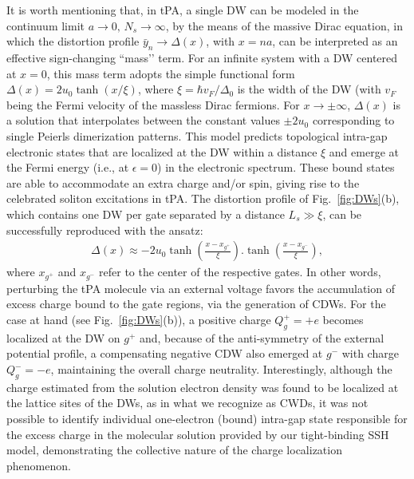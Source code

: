 \documentclass[10pt,a4paper]{article}
\begin{document}
It is worth mentioning that, in tPA, a single DW can be modeled in the continuum limit ${a \rightarrow 0, } \, { N_{s} \rightarrow \infty }$, by the means of the massive Dirac equation\cite{Jackiw76_Jackiw_Rebbi_soliton, Su79_Solitons_in_polyacetylene, Takayama80_Continuum_model_for_PA, Heeger88_Solitons_in_conducting_polymers}, in which the distortion profile ${\bar{y}_{n} \rightarrow \Delta(x)}$, with ${x = na}$, can be interpreted as an effective sign-changing ``mass’’ term. For an infinite system with a DW centered at $x=0$, this mass term adopts the simple functional form ${\Delta(x) = 2 u_{0} \tanh (x / \xi )}$, where ${\xi = \hbar v_{F} / \Delta_{0}}$ is the width of the DW (with $v_{F}$ being the Fermi velocity of the massless Dirac fermions\cite{Heeger88_Solitons_in_conducting_polymers}. For ${x \rightarrow \pm \infty}$, $\Delta(x)$ is a solution that interpolates between the constant values $\pm 2 u_{0}$ corresponding to single Peierls dimerization patterns. This model predicts topological intra-gap electronic states that are localized at the DW within a distance $\xi$ and emerge at the Fermi energy (i.e., at ${\epsilon = 0}$) in the electronic spectrum. These bound states are able to accommodate an extra charge and/or spin\cite{Asboth16_Short_course_on_TIs}, giving rise to the celebrated soliton excitations in tPA. The distortion profile of Fig.~\ref{fig:DWs}(b), which contains one DW per gate separated by a distance ${L_{s} \gg \xi}$, can be successfully reproduced with the ansatz:
%
\begin{eqnarray}
\Delta (x) \approx -2 u_{0} \tanh\left( \frac{x - x_{g^{+}}}{\xi} \right) . \tanh \left( \frac{x - x_{g^{-}}}{\xi} \right), 
\end{eqnarray}
%
where $x_{g^{+}}$ and $x_{g^{-}}$ refer to the center of the respective gates. In other words, perturbing the tPA molecule via an external voltage favors the accumulation of excess charge bound to the gate regions, via the generation of CDWs. For the case at hand (see Fig.~\ref{fig:DWs}(b)), a positive charge ${Q_{g}^{+} = +e}$ becomes localized at the DW on $g^{+}$ and, because of the anti-symmetry of the external potential profile, a compensating negative CDW also emerged at $g^{-}$ with charge ${Q_{g}^{-} = -e}$, maintaining the overall charge neutrality. Interestingly, although the charge estimated from the solution electron density was found to be localized at the lattice sites of the DWs, as in what we recognize as CWDs, it was not possible to identify individual one-electron (bound) intra-gap state responsible for the excess charge in the molecular solution provided by our tight-binding SSH model, demonstrating the collective nature of the charge localization phenomenon. %
\end{document}
